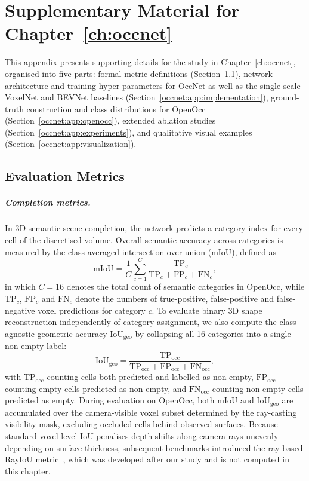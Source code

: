 \chapter{Supplementary Material for Chapter~\ref{ch:occnet}}\label{app:occnet}

This appendix presents supporting details for the study in Chapter~\ref{ch:occnet}, organised into five parts: formal metric definitions (Section~\ref{occnet:app:metrics}), network architecture and training hyper-parameters for OccNet as well as the single-scale VoxelNet and BEVNet baselines (Section~\ref{occnet:app:implementation}), ground-truth construction and class distributions for OpenOcc (Section~\ref{occnet:app:openocc}), extended ablation studies (Section~\ref{occnet:app:experiments}), and qualitative visual examples (Section~\ref{occnet:app:visualization}).

\section{Evaluation Metrics}\label{occnet:app:metrics}

\paragraph{Completion metrics.} In 3D semantic scene completion, the network predicts a category index for every cell of the discretised volume. Overall semantic accuracy across categories is measured by the class-averaged intersection-over-union (mIoU), defined as
\begin{equation}
  \text{mIoU} = \frac{1}{C}\sum_{c=1}^{C}\frac{\text{TP}_c}{\text{TP}_c+\text{FP}_c+\text{FN}_c},
  \label{occnet:eq:miou}
\end{equation}
in which $C=16$ denotes the total count of semantic categories in OpenOcc, while $\text{TP}_c$, $\text{FP}_c$ and $\text{FN}_c$ denote the numbers of true-positive, false-positive and false-negative voxel predictions for category $c$. To evaluate binary 3D shape reconstruction independently of category assignment, we also compute the class-agnostic geometric accuracy $\text{IoU}_{\text{geo}}$ by collapsing all 16 categories into a single non-empty label:
\begin{equation}
  \text{IoU}_{\text{geo}} = \frac{\text{TP}_{\text{occ}}}{\text{TP}_{\text{occ}}+\text{FP}_{\text{occ}}+\text{FN}_{\text{occ}}},
  \label{occnet:eq:iougeo}
\end{equation}
with $\text{TP}_{\text{occ}}$ counting cells both predicted and labelled as non-empty, $\text{FP}_{\text{occ}}$ counting empty cells predicted as non-empty, and $\text{FN}_{\text{occ}}$ counting non-empty cells predicted as empty. During evaluation on OpenOcc, both $\text{mIoU}$ and $\text{IoU}_{\text{geo}}$ are accumulated over the camera-visible voxel subset determined by the ray-casting visibility mask, excluding occluded cells behind observed surfaces. Because standard voxel-level IoU penalises depth shifts along camera rays unevenly depending on surface thickness, subsequent benchmarks introduced the ray-based RayIoU metric~\cite{liu2024sparseocc}, which was developed after our study and is not computed in this chapter.

